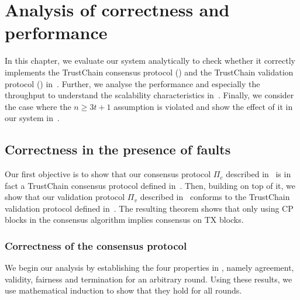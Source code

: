 \chapter{Analysis of correctness and performance}
\label{ch:analysis}

In this chapter,
we evaluate our system analytically to check whether it correctly implements the TrustChain consensus protocol ()
and the TrustChain validation protocol () in~.
Further, we analyse the performance and especially the throughput to understand the scalability characteristics in~.
Finally, we consider the case where the $n \ge 3t + 1$ assumption is violated and show the effect of it in our system in~.

\section{Correctness in the presence of faults}
\label{sec:correctness}
Our first objective is to show that our consensus protocol $\Pi_c$ described in~ is in fact a TrustChain consensus protocol defined in~.
Then, building on top of it, we show that our validation protocol $\Pi_v$ described in~ conforms to the TrustChain validation protocol defined in~.
The resulting theorem shows that only using CP blocks in the consensus algorithm implies consensus on TX blocks.


\subsection{Correctness of the consensus protocol}

We begin our analysis by establishing the four properties in ,
namely agreement, validity, fairness and termination for an arbitrary round.
Using these results, we use mathematical induction to show that they hold for all rounds.

